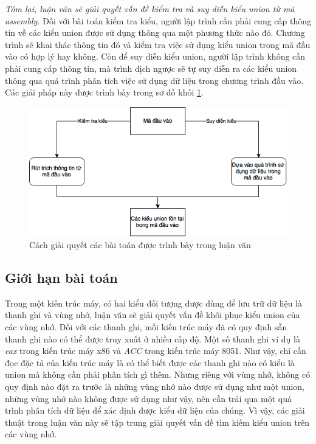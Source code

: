 \textit{Tóm lại, luận văn sẽ giải quyết vấn đề kiểm tra và suy diễn kiểu union từ mã assembly.} Đối với bài toán kiểm tra kiểu, người lập trình cần phải cung cấp thông tin về các kiểu union được sử dụng thông qua một phương thức nào đó. Chương trình sẽ khai thác thông tin đó và kiểm tra việc sử dụng kiểu union trong mã đầu vào có hợp lý hay không. Còn để suy diễn kiểu union, người lập trình không cần phải cung cấp thông tin, mà trình dịch ngược sẽ tự suy diễn ra các kiểu union thông qua quá trình phân tích việc sử dụng dữ liệu trong chương trình đầu vào. Các giải pháp này được trình bày trong sơ đồ khối \ref{fig:main}.

\begin{figure}
	\centering
	\includegraphics[scale=0.8]{image/main}
	\caption{Cách giải quyết các bài toán được trình bày trong luận văn}
	\label{fig:main}
\end{figure}

\subsection{Giới hạn bài toán}

Trong một kiến trúc máy, có hai kiểu đối tượng được dùng để lưu trữ dữ liệu là thanh ghi và vùng nhớ, luận văn sẽ giải quyết vấn đề khôi phục kiểu union của các vùng nhớ. Đối với các thanh ghi, mỗi kiến trúc máy đã có quy định sẵn thanh ghi nào có thể được truy xuất ở nhiều cấp độ. Một số thanh ghi ví dụ là \textit{eax} trong kiến trúc máy x86 và \textit{ACC} trong kiến trúc máy 8051. Như vậy, chỉ cần đọc đặc tả của kiến trúc máy là có thể biết được các thanh ghi nào có kiểu là union mà không cần phải phân tích gì thêm. Nhưng riêng với vùng nhớ, không có quy định nào đặt ra trước là những vùng nhớ nào được sử dụng như một union, những vùng nhớ nào không được sử dụng như vậy, nên cần trải qua một quá trình phân tích dữ liệu để xác định được kiểu dữ liệu của chúng. Vì vậy, các giải thuật trong luận văn này sẽ tập trung giải quyết vấn đề tìm kiếm kiểu union trên các vùng nhớ.\\

